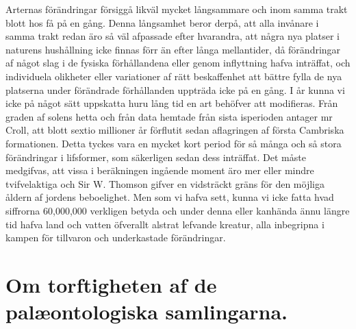 Arternas förändringar försiggå likväl mycket långsammare och inom samma trakt blott hos få på en gång. Denna långsamhet beror derpå, att alla invånare i samma trakt redan äro så väl afpassade efter hvarandra, att några nya platser i naturens hushållning icke finnas förr än efter långa mellantider, då förändringar af något slag i de fysiska förhållandena eller genom inflyttning hafva inträffat, och individuela olikheter eller variationer af rätt beskaffenhet att bättre fylla de nya platserna under förändrade förhållanden uppträda icke på en gång. I år kunna vi icke på något sätt uppskatta huru lång tid en art behöfver att modifieras. Från graden af solens hetta och från data hemtade från sista isperioden antager mr Croll, att blott sextio millioner år förflutit sedan aflagringen af första Cambriska formationen. Detta tyckes vara en mycket kort period för så många och så stora förändringar i lifsformer, som säkerligen sedan dess inträffat. Det måste medgifvas, att vissa i beräkningen ingående moment äro mer eller mindre tvifvelaktiga och Sir W. Thomson gifver en vidsträckt gräns för den möjliga åldern af jordens beboelighet. Men som vi hafva sett, kunna vi icke fatta hvad siffrorna 60,000,000 verkligen betyda och under denna eller kanhända ännu längre tid hafva land och vatten öfverallt alstrat lefvande kreatur, alla inbegripna i kampen för tillvaron och underkastade förändringar.



\section[De palæontologiska samlingarna]{Om torftigheten af de palæontologiska samlingarna.}

